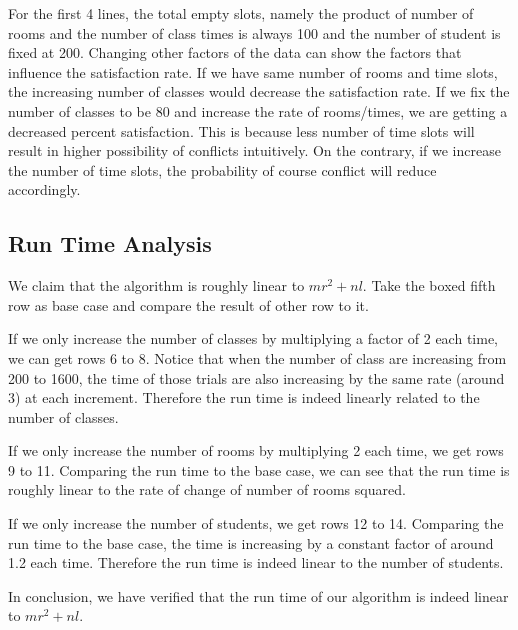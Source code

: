 \documentclass[11pt, oneside]{article}   	%
\begin{document}
For the first 4 lines, the total empty slots, namely the product of number of rooms and the number of class times is always 100 and the number of student is fixed at 200. Changing other factors of the data can show the factors that influence the satisfaction rate. If we have same number of rooms and time slots, the increasing number of classes would decrease the satisfaction rate. If we fix the number of classes to be 80 and increase the rate of rooms/times, we are getting a decreased percent satisfaction. This is because less number of time slots will result in higher possibility of conflicts intuitively. On the contrary, if we increase the number of time slots, the probability of course conflict will reduce accordingly.
\subsection{Run Time Analysis}
We claim that the algorithm is roughly linear to $mr^2 + nl$. Take the boxed fifth row as base case and compare the result of other row to it.

If we only increase the number of classes by multiplying a factor of 2 each time, we can get rows 6 to 8. Notice that when the number of class are increasing from 200 to 1600, the time of those trials are also increasing by the same rate (around 3) at each increment. Therefore the run time is indeed linearly related to the number of classes.

If we only increase the number of rooms by multiplying 2 each time, we get rows 9 to 11. Comparing the run time to the base case, we can see that the run time is roughly linear to the rate of change of number of rooms squared.

If we only increase the number of students, we get rows 12 to 14. Comparing the run time to the base case, the time is increasing by a constant factor of around 1.2 each time. Therefore the run time is indeed linear to the number of students.

In conclusion, we have verified that the run time of our algorithm is indeed linear to $mr^2 + nl$.

\end{document}

